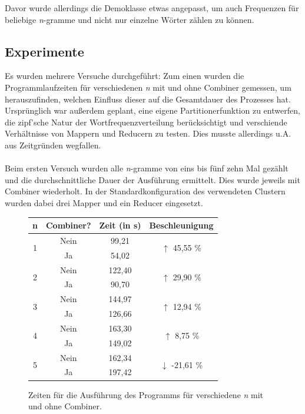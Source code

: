 \documentclass[a4paper,12pt]{scrartcl}
\begin{document}
    Davor wurde allerdings die Demoklasse etwas angepasst, um auch Frequenzen für beliebige \emph{n}-gramme und nicht nur einzelne Wörter zählen zu können.

    \subsection{Experimente}

    Es wurden mehrere Versuche durchgeführt: Zum einen wurden die Programmlaufzeiten für verschiedenen \emph{n} mit und ohne Combiner gemessen, um herauszufinden, welchen Einfluss dieser auf die Gesamtdauer des Prozesses hat. Ursprünglich war außerdem geplant, eine eigene Partitionerfunktion zu entwerfen, die zipf'sche Natur der Wortfrequenzverteilung berücksichtigt und verschiende Verhältnisse von Mappern und Reducern zu testen. Dies musste allerdings u.A. aus Zeitgründen wegfallen. \\ \\

    Beim ersten Versuch wurden alle \emph{n}-gramme von eins bis fünf zehn Mal gezählt und die durchschnittliche Dauer der Ausführung ermittelt. Dies wurde jeweils mit Combiner wiederholt. In der Standardkonfiguration des verwendeten Clustern wurden dabei drei Mapper und ein Reducer eingesetzt.

    \begin{figure}[h]
        \centering
        \begin{tabular}{c|c||c|c}
            n & Combiner? & Zeit (in s) & Beschleunigung\\
            \hline
            \multirow{2}{*}{1} & \textcolor{BrickRed}{Nein} & 99,21 & \multirow{2}{*}{\textcolor{OliveGreen}{$\uparrow$ 45,55 \%}} \\
             & \textcolor{OliveGreen}{Ja} & 54,02 & \\
             \hline
            \multirow{2}{*}{2} & \textcolor{BrickRed}{Nein} & 122,40 & \multirow{2}{*}{\textcolor{OliveGreen}{$\uparrow$ 29,90 \%}} \\
             & \textcolor{OliveGreen}{Ja} & 90,70 & \\
             \hline
             \multirow{2}{*}{3} & \textcolor{BrickRed}{Nein} & 144,97 & \multirow{2}{*}{\textcolor{OliveGreen}{$\uparrow$ 12,94 \%}} \\
             & \textcolor{OliveGreen}{Ja} & 126,66 & \\
             \hline
             \multirow{2}{*}{4} & \textcolor{BrickRed}{Nein} & 163,30 & \multirow{2}{*}{\textcolor{OliveGreen}{$\uparrow$ 8,75 \%}} \\
             & \textcolor{OliveGreen}{Ja} & 149,02 & \\
             \hline
             \multirow{2}{*}{5} & \textcolor{BrickRed}{Nein} & 162,34 & \multirow{2}{*}{\textcolor{BrickRed}{$\downarrow$ -21,61 \%}} \\
             & \textcolor{OliveGreen}{Ja} & 197,42 & \\
        \end{tabular}
        \caption{Zeiten für die Ausführung des Programms für verschiedene \emph{n} mit und ohne Combiner.}
    \end{figure}
\end{document}
